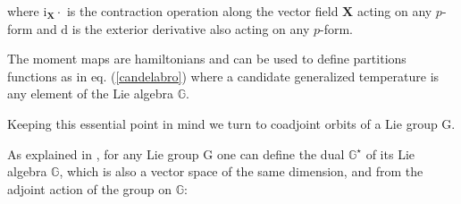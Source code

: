 \documentclass[10pt,a4paper]{article}
\begin{document}
 where $\mathrm{i}_{\boldsymbol{X}}\cdot $ is the contraction operation along the vector field $\boldsymbol{X}$ acting on any $p$-form and $\mathrm{d}$ is the exterior derivative also acting on any $p$-form.
\par
 The moment maps are hamiltonians and can be used to define partitions functions as in eq. (\ref{candelabro}) where a candidate generalized temperature  is any element of the  Lie algebra  $\mathbb{G}$.
 \par
 Keeping this essential point in mind we turn to coadjoint orbits of a Lie group $\mathrm{G}$.
 \par
 As explained in \cite{coaggiungo}, for any Lie group $\mathrm{G}$ one can define the dual $\mathbb{G}^\star$ of its Lie algebra $\mathbb{G}$, which is also a vector space of the same dimension, and from the adjoint action of the group on $\mathbb{G}$:
\end{document}
